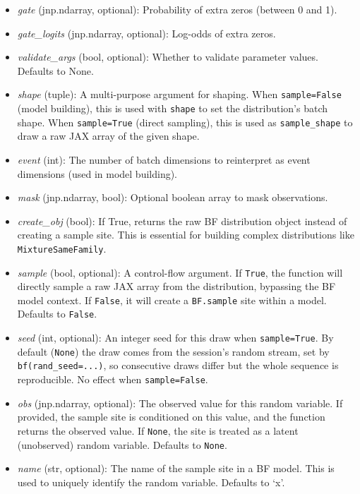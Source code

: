 \documentclass[
  letterpaper,
  DIV=11,
  numbers=noendperiod]{scrartcl}
\begin{document}
\begin{itemize}
\item
  \emph{gate} (jnp.ndarray, optional): Probability of extra zeros
  (between 0 and 1).
\item
  \emph{gate\_logits} (jnp.ndarray, optional): Log-odds of extra zeros.
\item
  \emph{validate\_args} (bool, optional): Whether to validate parameter
  values. Defaults to None.
\item
  \emph{shape} (tuple): A multi-purpose argument for shaping. When
  \texttt{sample=False} (model building), this is used with
  \texttt{shape} to set the distribution's batch shape. When
  \texttt{sample=True} (direct sampling), this is used as
  \texttt{sample\_shape} to draw a raw JAX array of the given shape.
\item
  \emph{event} (int): The number of batch dimensions to reinterpret as
  event dimensions (used in model building).
\item
  \emph{mask} (jnp.ndarray, bool): Optional boolean array to mask
  observations.
\item
  \emph{create\_obj} (bool): If True, returns the raw BF distribution
  object instead of creating a sample site. This is essential for
  building complex distributions like \texttt{MixtureSameFamily}.
\item
  \emph{sample} (bool, optional): A control-flow argument. If
  \texttt{True}, the function will directly sample a raw JAX array from
  the distribution, bypassing the BF model context. If \texttt{False},
  it will create a \texttt{BF.sample} site within a model. Defaults to
  \texttt{False}.
\item
  \emph{seed} (int, optional): An integer seed for this draw when
  \texttt{sample=True}. By default (\texttt{None}) the draw comes from
  the session's random stream, set by \texttt{bf(rand\_seed=...)}, so
  consecutive draws differ but the whole sequence is reproducible. No
  effect when \texttt{sample=False}.
\item
  \emph{obs} (jnp.ndarray, optional): The observed value for this random
  variable. If provided, the sample site is conditioned on this value,
  and the function returns the observed value. If \texttt{None}, the
  site is treated as a latent (unobserved) random variable. Defaults to
  \texttt{None}.
\item
  \emph{name} (str, optional): The name of the sample site in a BF
  model. This is used to uniquely identify the random variable. Defaults
  to `x'.
\end{itemize}
\end{document}
